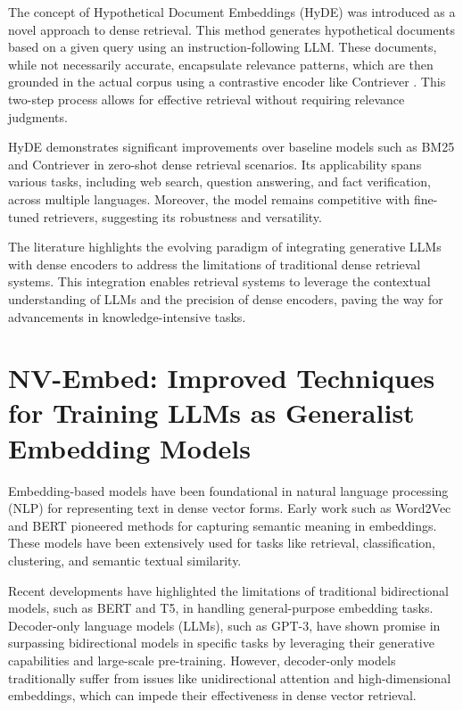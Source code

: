 The concept of Hypothetical Document Embeddings (HyDE) was introduced as a novel approach to dense retrieval. This method generates hypothetical documents based on a given query using an instruction-following LLM. These documents, while not necessarily accurate, encapsulate relevance patterns, which are then grounded in the actual corpus using a contrastive encoder like Contriever \cite{izacard2022unsuperviseddenseinformationretrieval}. This two-step process allows for effective retrieval without requiring relevance judgments.

HyDE demonstrates significant improvements over baseline models such as BM25 and Contriever in zero-shot dense retrieval scenarios. Its applicability spans various tasks, including web search, question answering, and fact verification, across multiple languages. Moreover, the model remains competitive with fine-tuned retrievers, suggesting its robustness and versatility.

The literature highlights the evolving paradigm of integrating generative LLMs with dense encoders to address the limitations of traditional dense retrieval systems. This integration enables retrieval systems to leverage the contextual understanding of LLMs and the precision of dense encoders, paving the way for advancements in knowledge-intensive tasks.

\section*{NV-Embed: Improved Techniques for Training LLMs as Generalist Embedding Models}

Embedding-based models have been foundational in natural language processing (NLP) for representing text in dense vector forms. Early work such as Word2Vec and BERT pioneered methods for capturing semantic meaning in embeddings. These models have been extensively used for tasks like retrieval, classification, clustering, and semantic textual similarity.

Recent developments have highlighted the limitations of traditional bidirectional models, such as BERT and T5, in handling general-purpose embedding tasks. Decoder-only language models (LLMs), such as GPT-3, have shown promise in surpassing bidirectional models in specific tasks by leveraging their generative capabilities and large-scale pre-training. However, decoder-only models traditionally suffer from issues like unidirectional attention and high-dimensional embeddings, which can impede their effectiveness in dense vector retrieval.

